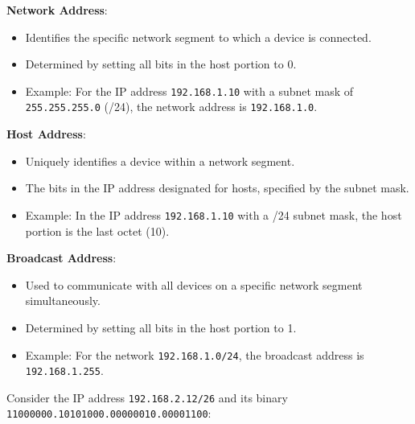 \begin{Def}
    
        \item \textbf{Network Address}:
        \begin{itemize}
            \item Identifies the specific network segment to which a device is connected.
            \item Determined by setting all bits in the host portion to 0.
            \item Example: For the IP address \texttt{192.168.1.10} with a subnet mask of \texttt{255.255.255.0} (/24), the network address is \texttt{192.168.1.0}.
        \end{itemize}

        \item \textbf{Host Address}:
        \begin{itemize}
            \item Uniquely identifies a device within a network segment.
            \item The bits in the IP address designated for hosts, specified by the subnet mask.
            \item Example: In the IP address \texttt{192.168.1.10} with a /24 subnet mask, the host portion is the last octet (10).
        \end{itemize}

        \item \textbf{Broadcast Address}:
        \begin{itemize}
            \item Used to communicate with all devices on a specific network segment simultaneously.
            \item Determined by setting all bits in the host portion to 1.
            \item Example: For the network \texttt{192.168.1.0/24}, the broadcast address is \texttt{192.168.1.255}.
        \end{itemize}
      

    \hfill \cite{sunshine_rfc919} \cite{postel_rfc922} \cite{manning_rfc1878}

\end{Def}
\noindent
Consider the IP address \texttt{192.168.2.12/26} and its binary \texttt{11000000.10101000.00000010.00001100}:

